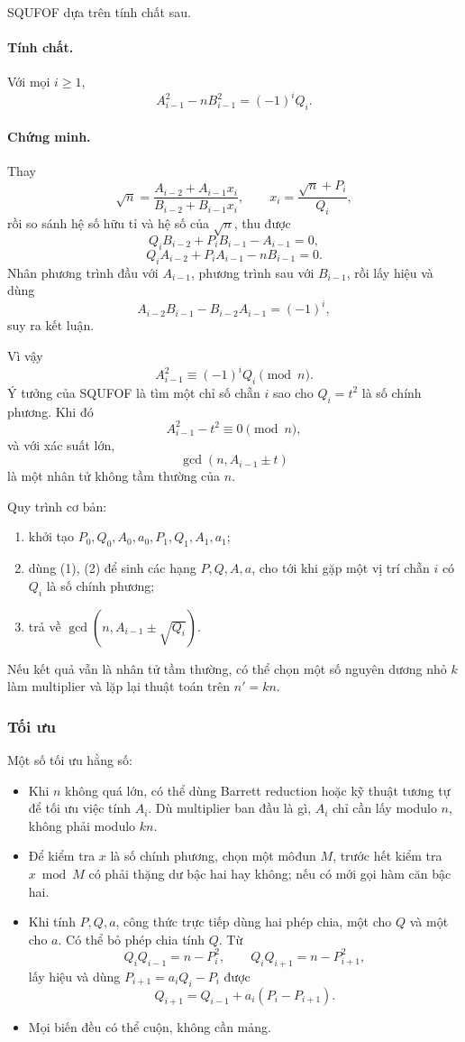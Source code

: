 \documentclass[11pt]{article}
\begin{document}
SQUFOF dựa trên tính chất sau.

\paragraph{Tính chất.}
Với mọi \(i\ge 1\),
\[
  A_{i-1}^2-nB_{i-1}^2=(-1)^iQ_i.
\]

\paragraph{Chứng minh.}
Thay
\[
  \sqrt n=\frac{A_{i-2}+A_{i-1}x_i}{B_{i-2}+B_{i-1}x_i},
  \qquad
  x_i=\frac{\sqrt n+P_i}{Q_i},
\]
rồi so sánh hệ số hữu tỉ và hệ số của \(\sqrt n\), thu được
\[
  Q_iB_{i-2}+P_iB_{i-1}-A_{i-1}=0,
\]
\[
  Q_iA_{i-2}+P_iA_{i-1}-nB_{i-1}=0.
\]
Nhân phương trình đầu với \(A_{i-1}\), phương trình sau với \(B_{i-1}\), rồi
lấy hiệu và dùng
\[
  A_{i-2}B_{i-1}-B_{i-2}A_{i-1}=(-1)^i,
\]
suy ra kết luận.

Vì vậy
\[
  A_{i-1}^2\equiv (-1)^iQ_i\pmod n.
\]
Ý tưởng của SQUFOF là tìm một chỉ số chẵn \(i\) sao cho \(Q_i=t^2\) là số chính
phương. Khi đó
\[
  A_{i-1}^2-t^2\equiv 0\pmod n,
\]
và với xác suất lớn,
\[
  \gcd(n,A_{i-1}\pm t)
\]
là một nhân tử không tầm thường của \(n\).

Quy trình cơ bản:
\begin{enumerate}
  \item khởi tạo \(P_0,Q_0,A_0,a_0,P_1,Q_1,A_1,a_1\);
  \item dùng (1), (2) để sinh các hạng \(P,Q,A,a\), cho tới khi gặp một vị trí
  chẵn \(i\) có \(Q_i\) là số chính phương;
  \item trả về \(\gcd(n,A_{i-1}\pm\sqrt{Q_i})\).
\end{enumerate}
Nếu kết quả vẫn là nhân tử tầm thường, có thể chọn một số nguyên dương nhỏ
\(k\) làm multiplier và lặp lại thuật toán trên \(n'=kn\).

\subsubsection{Tối ưu}

Một số tối ưu hằng số:
\begin{itemize}
  \item Khi \(n\) không quá lớn, có thể dùng Barrett reduction hoặc kỹ thuật
  tương tự để tối ưu việc tính \(A_i\). Dù multiplier ban đầu là gì,
  \(A_i\) chỉ cần lấy modulo \(n\), không phải modulo \(kn\).
  \item Để kiểm tra \(x\) là số chính phương, chọn một môđun \(M\), trước hết
  kiểm tra \(x\bmod M\) có phải thặng dư bậc hai hay không; nếu có mới gọi
  hàm căn bậc hai.
  \item Khi tính \(P,Q,a\), công thức trực tiếp dùng hai phép chia, một cho
  \(Q\) và một cho \(a\). Có thể bỏ phép chia tính \(Q\). Từ
  \[
    Q_iQ_{i-1}=n-P_i^2,\qquad Q_iQ_{i+1}=n-P_{i+1}^2,
  \]
  lấy hiệu và dùng \(P_{i+1}=a_iQ_i-P_i\) được
  \[
    Q_{i+1}=Q_{i-1}+a_i(P_i-P_{i+1}). \tag{3}
  \]
  \item Mọi biến đều có thể cuộn, không cần mảng.
\end{itemize}
\end{document}
